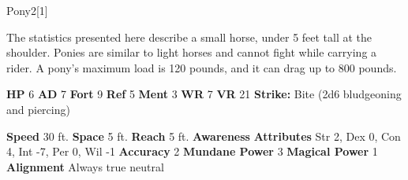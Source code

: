   \begin{monsection}{Pony}{2}[1]
    \vspace{-1em}\vspace{-1em}
    \vspace{0em}

    
      The statistics presented here describe a small horse, under 5 feet tall at the shoulder.
      Ponies are similar to light horses and cannot fight while carrying a rider.
      A pony's maximum load is 120 pounds, and it can drag up to 800 pounds.
    
    

    \begin{spellcontent}
      \begin{spelltargetinginfo}
        \pari \textbf{HP} 6 \monsep
          \textbf{AD} 7 \monsep
          \textbf{Fort} 9 \monsep
          \textbf{Ref} 5 \monsep
          \textbf{Ment} 3
        \pari \textbf{WR} 7 \monsep
        \textbf{VR} 21
        \pari \textbf{Strike:}
            Bite  (2d6 bludgeoning and piercing)
      \end{spelltargetinginfo}
    \end{spellcontent}
    \begin{monsterfooter}
      \pari \textbf{Speed} 30 ft. \monsep
        \textbf{Space} 5 ft. \monsep
        \textbf{Reach} 5 ft.
      \pari \textbf{Awareness} 
      \pari \textbf{Attributes}
        Str 2, Dex 0,
        Con 4, Int -7,
        Per 0, Wil -1
      \pari \textbf{Accuracy} 2 \monsep
        \textbf{Mundane Power} 3 \monsep
      \textbf{Magical Power} 1
      \pari \textbf{Alignment} Always true neutral
    \end{monsterfooter}
  \end{monsection}
  
